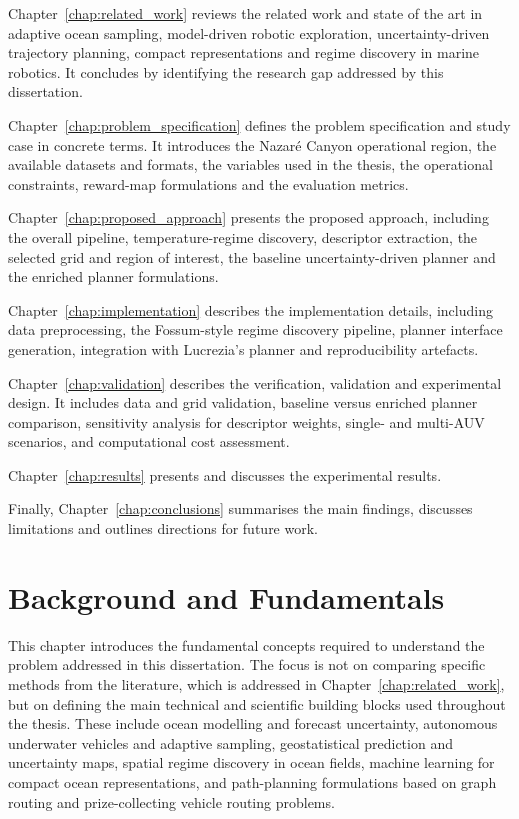 Chapter~\ref{chap:related_work} reviews the related work and state of the art in adaptive ocean sampling, model-driven robotic exploration, uncertainty-driven trajectory planning, compact representations and regime discovery in marine robotics. It concludes by identifying the research gap addressed by this dissertation.

Chapter~\ref{chap:problem_specification} defines the problem specification and study case in concrete terms. It introduces the Nazaré Canyon operational region, the available datasets and formats, the variables used in the thesis, the operational constraints, reward-map formulations and the evaluation metrics.

Chapter~\ref{chap:proposed_approach} presents the proposed approach, including the overall pipeline, temperature-regime discovery, descriptor extraction, the selected grid and region of interest, the baseline uncertainty-driven planner and the enriched planner formulations.

Chapter~\ref{chap:implementation} describes the implementation details, including data preprocessing, the Fossum-style regime discovery pipeline, planner interface generation, integration with Lucrezia's planner and reproducibility artefacts.

Chapter~\ref{chap:validation} describes the verification, validation and experimental design. It includes data and grid validation, baseline versus enriched planner comparison, sensitivity analysis for descriptor weights, single- and multi-AUV scenarios, and computational cost assessment.

Chapter~\ref{chap:results} presents and discusses the experimental results.

Finally, Chapter~\ref{chap:conclusions} summarises the main findings, discusses limitations and outlines directions for future work.



\chapter{Background and Fundamentals} \label{chap:background}

This chapter introduces the fundamental concepts required to understand the problem addressed in this dissertation. The focus is not on comparing specific methods from the literature, which is addressed in Chapter~\ref{chap:related_work}, but on defining the main technical and scientific building blocks used throughout the thesis. These include ocean modelling and forecast uncertainty, autonomous underwater vehicles and adaptive sampling, geostatistical prediction and uncertainty maps, spatial regime discovery in ocean fields, machine learning for compact ocean representations, and path-planning formulations based on graph routing and prize-collecting vehicle routing problems.

